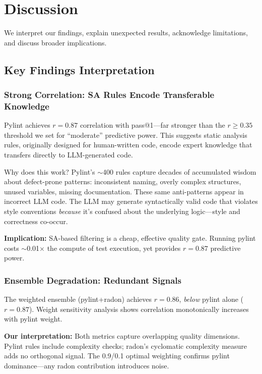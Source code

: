 \section{Discussion}
\label{sec:discussion}

We interpret our findings, explain unexpected results, acknowledge limitations, and discuss broader implications.

\subsection{Key Findings Interpretation}

\subsubsection{Strong Correlation: SA Rules Encode Transferable Knowledge}

Pylint achieves $r=0.87$ correlation with pass@1---far stronger than the $r\geq0.35$ threshold we set for ``moderate'' predictive power. This suggests static analysis rules, originally designed for human-written code, encode expert knowledge that transfers directly to LLM-generated code.

Why does this work? Pylint's $\sim$400 rules capture decades of accumulated wisdom about defect-prone patterns: inconsistent naming, overly complex structures, unused variables, missing documentation. These same anti-patterns appear in incorrect LLM code. The LLM may generate syntactically valid code that violates style conventions \emph{because} it's confused about the underlying logic---style and correctness co-occur.

\textbf{Implication:} SA-based filtering is a cheap, effective quality gate. Running pylint costs $\sim$0.01$\times$ the compute of test execution, yet provides $r=0.87$ predictive power.

\subsubsection{Ensemble Degradation: Redundant Signals}

The weighted ensemble (pylint+radon) achieves $r=0.86$, \emph{below} pylint alone ($r=0.87$). Weight sensitivity analysis shows correlation monotonically increases with pylint weight.

\textbf{Our interpretation:} Both metrics capture overlapping quality dimensions. Pylint rules include complexity checks; radon's cyclomatic complexity measure adds no orthogonal signal. The 0.9/0.1 optimal weighting confirms pylint dominance---any radon contribution introduces noise.

